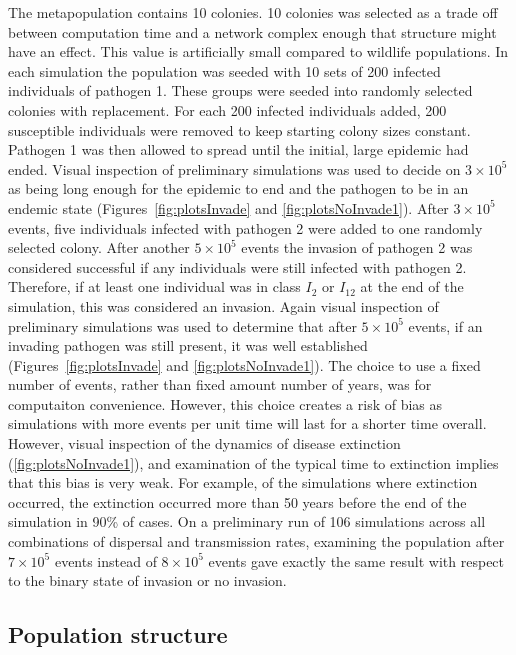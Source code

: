 The metapopulation contains 10 colonies.
10 colonies was selected as a trade off between computation time and a network complex enough that structure might have an effect. 
This value is artificially small compared to wildlife populations. 
In each simulation the population was seeded with 10 sets of 200 infected individuals of pathogen 1.
These groups were seeded into randomly selected colonies with replacement.
For each 200 infected individuals added, 200 susceptible individuals were removed to keep starting colony sizes constant. 
Pathogen 1 was then allowed to spread until the initial, large epidemic had ended. 
Visual inspection of preliminary simulations was used to decide on \ensuremath{3\times 10^{5}} as being long enough for the epidemic to end and the pathogen to be in an endemic state (Figures~\ref{fig:plotsInvade} and \ref{fig:plotsNoInvade1}).
After \ensuremath{3\times 10^{5}} events, five individuals infected with pathogen 2 were added to one randomly selected colony. 
After another \ensuremath{5\times 10^{5}} events the invasion of pathogen 2 was considered successful if any individuals were still infected with pathogen 2.
Therefore, if at least one individual was in class $I_2$ or $I_{12}$ at the end of the simulation, this was considered an invasion.
Again visual inspection of preliminary simulations was used to determine that after \ensuremath{5\times 10^{5}} events, if an invading pathogen was still present, it was well established (Figures~\ref{fig:plotsInvade} and \ref{fig:plotsNoInvade1}).
The choice to use a fixed number of events, rather than fixed amount number of years, was for computaiton convenience.
However, this choice creates a risk of bias as simulations with more events per unit time will last for a shorter time overall.
However, visual inspection of the dynamics of disease extinction (\ref{fig:plotsNoInvade1}), and examination of the typical time to extinction implies that this bias is very weak.
For example, of the simulations where extinction occurred, the extinction occurred more than 50 years before the end of the simulation in 90\% of cases.
On a preliminary run of 106 simulations across all combinations of dispersal and transmission rates, examining the population after $7 \times 10^5$ events instead of \ensuremath{8\times 10^{5}} events gave exactly the same result with respect to the binary state of invasion or no invasion. 


\subsection{Population structure}

